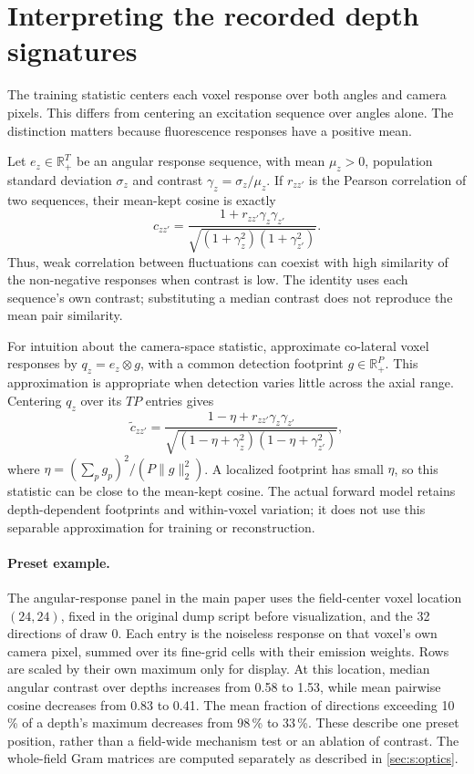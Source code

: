 \section{Interpreting the recorded depth signatures}
\label{sec:s:signatureinterpretation}

The training statistic centers each voxel response over both angles and camera pixels. This differs from centering an excitation sequence over angles alone. The distinction matters because fluorescence responses have a positive mean.

Let $e_z\in\mathbb R_+^T$ be an angular response sequence, with mean $\mu_z>0$, population standard deviation $\sigma_z$ and contrast $\gamma_z=\sigma_z/\mu_z$. If $r_{zz'}$ is the Pearson correlation of two sequences, their mean-kept cosine is exactly
\begin{equation}
c_{zz'}=
\frac{1+r_{zz'}\gamma_z\gamma_{z'}}
{\sqrt{(1+\gamma_z^2)(1+\gamma_{z'}^2)}}.
\label{eq:s:cosine}
\end{equation}
Thus, weak correlation between fluctuations can coexist with high similarity of the non-negative responses when contrast is low. The identity uses each sequence's own contrast; substituting a median contrast does not reproduce the mean pair similarity.

For intuition about the camera-space statistic, approximate co-lateral voxel responses by $q_z=e_z\otimes g$, with a common detection footprint $g\in\mathbb R_+^P$. This approximation is appropriate when detection varies little across the axial range. Centering $q_z$ over its $TP$ entries gives
\begin{equation}
\widetilde c_{zz'}=
\frac{1-\eta+r_{zz'}\gamma_z\gamma_{z'}}
{\sqrt{(1-\eta+\gamma_z^2)(1-\eta+\gamma_{z'}^2)}},
\label{eq:s:footprint}
\end{equation}
where $\eta=(\sum_p g_p)^2/(P\|g\|_2^2)$. A localized footprint has small $\eta$, so this statistic can be close to the mean-kept cosine. The actual forward model retains depth-dependent footprints and within-voxel variation; it does not use this separable approximation for training or reconstruction.

\paragraph{Preset example.} The angular-response panel in the main paper uses the field-center voxel location $(24,24)$, fixed in the original dump script before visualization, and the 32 directions of draw 0. Each entry is the noiseless response on that voxel's own camera pixel, summed over its fine-grid cells with their emission weights. Rows are scaled by their own maximum only for display. At this location, median angular contrast over depths increases from 0.58 to 1.53, while mean pairwise cosine decreases from 0.83 to 0.41. The mean fraction of directions exceeding 10\,\% of a depth's maximum decreases from 98\,\% to 33\,\%. These describe one preset position, rather than a field-wide mechanism test or an ablation of contrast. The whole-field Gram matrices are computed separately as described in \cref{sec:s:optics}.
